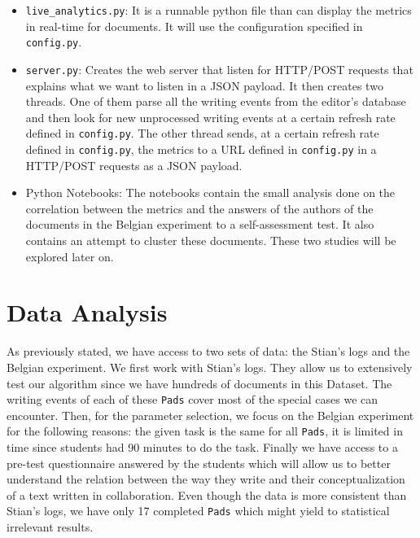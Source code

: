 \documentclass[a4, twocolumn, 12pt]{article}
\begin{document}
\begin{itemize}
    \item \texttt{live\_analytics.py}: It is a runnable python file than can display the metrics in real-time for documents. It will use the configuration specified in \texttt{config.py}.
    
    \item \texttt{server.py}: Creates the web server that listen for HTTP/POST requests that explains what we want to listen in a JSON payload. It then creates two threads. One of them parse all the writing events from the editor's database and then look for new unprocessed writing events at a certain refresh rate defined in \texttt{config.py}. The other thread sends, at a certain refresh rate defined in \texttt{config.py}, the metrics to a URL defined in \texttt{config.py} in a HTTP/POST requests as a JSON payload.
    
    \item Python Notebooks: The notebooks contain the small analysis done on the correlation between the metrics and the answers of the authors of the documents in the Belgian experiment to a self-assessment test. It also contains an attempt to cluster these documents. These two studies will be explored later on.
    
\end{itemize}

\section{Data Analysis}
As previously stated, we have access to two sets of data: the Stian’s logs and the Belgian experiment. We first work with Stian’s logs. They allow us to extensively test our algorithm since we have hundreds of documents in this Dataset. The writing events of each of these \texttt{Pads} cover most of the special cases we can encounter. Then, for the parameter selection, we focus on the Belgian experiment for the following reasons: the given task is the same for all \texttt{Pads}, it is limited in time since students had 90 minutes to do the task. Finally we have access to a pre-test questionnaire answered by the students which will allow us to better understand the relation between the way they write and their conceptualization of a text written in collaboration. Even though the data is more consistent than Stian’s logs, we have only 17 completed \texttt{Pads} which might yield to statistical irrelevant results.
\end{document}
